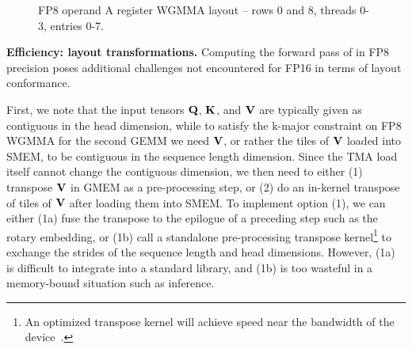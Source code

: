 \begin{figure}
\centering
{}
\caption{FP8 operand A register WGMMA layout -- rows 0 and 8, threads 0-3, entries 0-7.}
\label{fig:rmem_operand}
\end{figure}

\textbf{Efficiency: layout transformations.}
Computing the forward pass of \fat in FP8 precision poses additional challenges not encountered for FP16 in terms of layout conformance.

First, we note that the input tensors $\mathbf{Q}$, $\mathbf{K}$, and $\mathbf{V}$
are typically given as contiguous in the head dimension,
while to satisfy the k-major constraint on FP8 WGMMA for the second GEMM we need $\mathbf{V}$,
or rather the tiles of $\mathbf{V}$ loaded into SMEM, to be contiguous in the sequence length dimension.
Since the TMA load itself cannot change the contiguous dimension, we then need to either
(1) transpose $\mathbf{V}$ in GMEM as a pre-processing step, or
(2) do an in-kernel transpose of tiles of $\mathbf{V}$ after loading them into SMEM.
To implement option (1), we can either
(1a) fuse the transpose to the epilogue of a preceding step such as the rotary embedding, or
(1b) call a standalone pre-processing transpose
kernel\footnote{An optimized transpose kernel will achieve speed near the bandwidth of the device~\citep{colfax_cutlass_transpose_2024}.}
to exchange the strides of the sequence length and head dimensions.
However, (1a) is difficult to integrate into a standard library,
and (1b) is too wasteful in a memory-bound situation such as inference.

